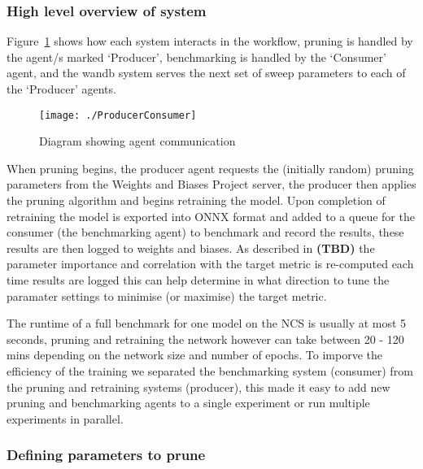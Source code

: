 \documentclass[../Dissertation.tex]{subfiles}
\begin{document}
\newpage
\subsubsection{High level overview of system}

Figure~\ref{fig:agentCommunication} shows how each system interacts in the workflow, pruning is handled by the agent/s marked `Producer', benchmarking is handled by the `Consumer' agent, and the wandb system serves the next set of sweep parameters to each of the `Producer' agents.

\begin{figure}[H]
    \centering
    \texttt{[image: ./ProducerConsumer]}
    \caption{Diagram showing agent communication}
    \label{fig:agentCommunication}
\end{figure}

When pruning begins, the producer agent requests the (initially random) pruning parameters from the Weights and Biases Project server, the producer then applies the pruning algorithm and begins retraining the model.
Upon completion of retraining the model is exported into ONNX format and added to a queue for the consumer (the benchmarking agent) to benchmark and record the results, these results are then logged to weights and biases.
As described in \textbf{(TBD)} the parameter importance and correlation with the target metric is re-computed each time results are logged this can help determine in what direction to tune the paramater settings to minimise (or maximise) the target metric.

The runtime of a full benchmark for one model on the NCS is usually at most 5 seconds, pruning and retraining the network however can take between 20 - 120 mins depending on the network size and number of epochs. 
To imporve the efficiency of the training we separated the benchmarking system (consumer) from the pruning and retraining systems (producer), this made it easy to add new pruning and benchmarking agents to a single experiment or run multiple experiments in parallel.

\subsubsection{Defining parameters to prune}
\end{document}
